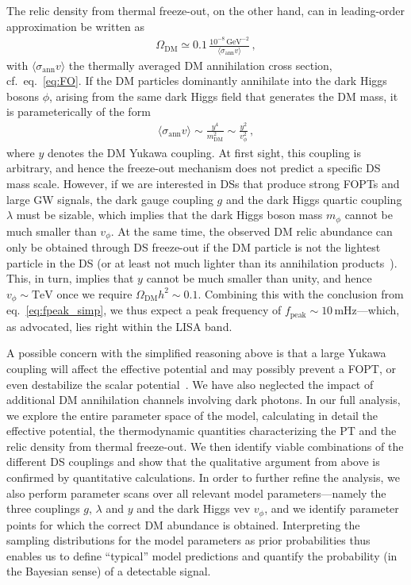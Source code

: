The relic density from thermal freeze-out, on the other hand, can in leading-order approximation be written as~\cite{Kolb:1990vq}
\begin{align}
	\Omega_\text{DM} \simeq 0.1 \,
	\frac{10^{-8} \, \text{GeV}^{-2}}{\langle \sigma_\text{ann} v \rangle} \,,
\end{align}
with ${\langle \sigma_\text{ann} v \rangle}$ the thermally averaged \ac{DM} annihilation cross section, cf.~eq.~\eqref{eq:FO}. If the \ac{DM} particles dominantly annihilate into the dark Higgs bosons $\phi$, arising from the same dark Higgs field that generates the \ac{DM} mass, it is parameterically of the form 
\begin{align}
	\langle \sigma_\text{ann} v \rangle \sim \frac{y^4}{m_\text{DM}^2} \sim \frac{y^2}{v_\phi^2} \,,
\end{align}
where $y$ denotes the \ac{DM} Yukawa coupling. At first sight, this coupling is arbitrary, and hence the freeze-out mechanism does not predict a specific \ac{DS} mass scale. However, if we are interested in \acp{DS} that produce strong \acp{FOPT} and large \ac{GW} signals, the dark gauge coupling $g$ and the dark Higgs quartic coupling $\lambda$ must be sizable, which implies that the dark Higgs boson mass $m_\phi$ cannot be much smaller than $v_\phi$. At the same time, the observed \ac{DM} relic abundance can only be obtained through \ac{DS} freeze-out if the \ac{DM} particle is  not the lightest particle in the \ac{DS} (or at least not much lighter than its annihilation products~\cite{DAgnolo:2015ujb}). This, in turn, implies that $y$ cannot be much smaller than unity, and hence $v_\phi \sim \mathrm{TeV}$ once we require $\Omega_\text{DM} h^2 \sim 0.1$. Combining this with the conclusion from eq.~\eqref{eq:fpeak_simp}, we thus expect a peak frequency of $f_\mathrm{peak} \sim 10 \, \text{mHz}$---which, as advocated, lies right within the \ac{LISA} band.

A possible concern with the simplified reasoning above is that a large Yukawa coupling will affect the effective potential and may possibly prevent a \ac{FOPT}, or even destabilize the scalar potential~\cite{Weinberg:1976pe}. We have also neglected the impact of additional \ac{DM} annihilation channels involving dark photons. In our full analysis, we explore the entire parameter space of the model, calculating in detail the effective potential, the thermodynamic  quantities characterizing the \ac{PT} and the relic density from thermal freeze-out. We then identify viable combinations of the different \ac{DS} couplings and show that the qualitative argument from above is confirmed by quantitative calculations. In order to further refine the analysis, we also perform parameter scans over all relevant model parameters---namely the three couplings $g$, $\lambda$ and $y$ and the dark Higgs \ac{vev} $v_\phi$, and we identify parameter points for which the correct \ac{DM} abundance is obtained. Interpreting the sampling distributions for the model parameters as prior probabilities thus enables us to define ``typical'' model predictions and quantify the probability (in the Bayesian sense) of a detectable signal.

